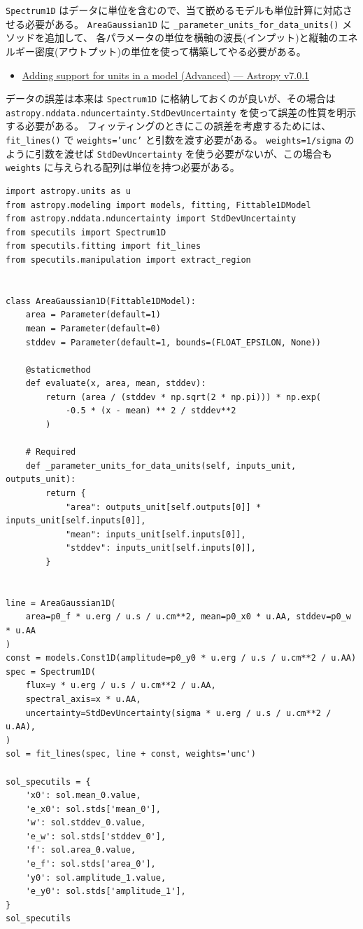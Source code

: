 \documentclass[a4paper, 8pt, notitlepage, uplatex, dvipdfmx]{jsarticle}
\begin{document}
\texttt{Spectrum1D} はデータに単位を含むので、当て嵌めるモデルも単位計算に対応させる必要がある。
\texttt{AreaGaussian1D} に \texttt{\_parameter\_units\_for\_data\_units()} メソッドを追加して、
各パラメータの単位を横軸の波長(インプット)と縦軸のエネルギー密度(アウトプット)の単位を使って構築してやる必要がある。
\begin{itemize}
\item \href{https://docs.astropy.org/en/stable/modeling/add-units.html}{Adding support for units in a model (Advanced) — Astropy v7.0.1}
\end{itemize}

データの誤差は本来は \texttt{Spectrum1D} に格納しておくのが良いが、その場合は \texttt{astropy.nddata.nduncertainty.StdDevUncertainty} を使って誤差の性質を明示する必要がある。
フィッティングのときにこの誤差を考慮するためには、 \texttt{fit\_lines()} で \texttt{weights='unc'} と引数を渡す必要がある。
\texttt{weights=1/sigma} のように引数を渡せば \texttt{StdDevUncertainty} を使う必要がないが、この場合も \texttt{weights} に与えられる配列は単位を持つ必要がある。

\begin{verbatim}
import astropy.units as u
from astropy.modeling import models, fitting, Fittable1DModel
from astropy.nddata.nduncertainty import StdDevUncertainty
from specutils import Spectrum1D
from specutils.fitting import fit_lines
from specutils.manipulation import extract_region


class AreaGaussian1D(Fittable1DModel):
    area = Parameter(default=1)
    mean = Parameter(default=0)
    stddev = Parameter(default=1, bounds=(FLOAT_EPSILON, None))

    @staticmethod
    def evaluate(x, area, mean, stddev):
        return (area / (stddev * np.sqrt(2 * np.pi))) * np.exp(
            -0.5 * (x - mean) ** 2 / stddev**2
        )

    # Required
    def _parameter_units_for_data_units(self, inputs_unit, outputs_unit):
        return {
            "area": outputs_unit[self.outputs[0]] * inputs_unit[self.inputs[0]],
            "mean": inputs_unit[self.inputs[0]],
            "stddev": inputs_unit[self.inputs[0]],
        }


line = AreaGaussian1D(
    area=p0_f * u.erg / u.s / u.cm**2, mean=p0_x0 * u.AA, stddev=p0_w * u.AA
)
const = models.Const1D(amplitude=p0_y0 * u.erg / u.s / u.cm**2 / u.AA)
spec = Spectrum1D(
    flux=y * u.erg / u.s / u.cm**2 / u.AA,
    spectral_axis=x * u.AA,
    uncertainty=StdDevUncertainty(sigma * u.erg / u.s / u.cm**2 / u.AA),
)
sol = fit_lines(spec, line + const, weights='unc')

sol_specutils = {
    'x0': sol.mean_0.value,
    'e_x0': sol.stds['mean_0'],
    'w': sol.stddev_0.value,
    'e_w': sol.stds['stddev_0'],
    'f': sol.area_0.value,
    'e_f': sol.stds['area_0'],
    'y0': sol.amplitude_1.value,
    'e_y0': sol.stds['amplitude_1'],
}
sol_specutils
\end{verbatim}
\end{document}
